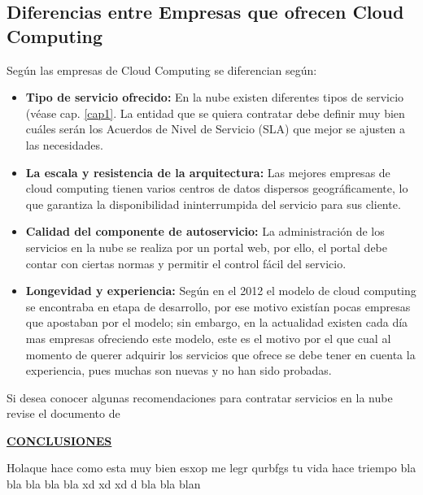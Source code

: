 \documentclass[a4paper, 12pt]{report}
\begin{document}
\begin{justify}
\section{Diferencias entre Empresas que ofrecen Cloud Computing}
 Seg\'un \cite{Akami} las empresas de Cloud Computing se diferencian seg\'un:
\begin{itemize}
	\item \textbf{Tipo de servicio ofrecido: } En la nube existen diferentes tipos de servicio (v\'ease cap. \ref{cap1}. La entidad que se quiera contratar debe definir muy bien cu\'ales ser\'an los Acuerdos de Nivel de Servicio (SLA) que mejor se ajusten a las necesidades.
	\item \textbf{La escala y resistencia de la arquitectura:} Las mejores empresas de cloud computing tienen varios centros de datos dispersos geográficamente, lo que garantiza la disponibilidad ininterrumpida del servicio para sus cliente.
	\item \textbf{Calidad del componente de autoservicio:} La administraci\'on  de los servicios en la nube se realiza por un portal web, por ello, el portal debe contar con ciertas normas y permitir el control f\'acil del servicio.
	\item \textbf{Longevidad y experiencia:} Seg\'un \cite{CristianCA} en el 2012  el modelo de cloud computing se encontraba en etapa de desarrollo, por ese motivo existían pocas empresas que apostaban por el modelo; sin embargo,  en la actualidad existen cada día mas empresas ofreciendo este modelo, este es el motivo por el que cual al momento de querer adquirir los servicios que ofrece se debe tener en cuenta la experiencia, pues muchas son nuevas y no han sido probadas.
\end{itemize}
\par Si desea conocer algunas recomendaciones para contratar servicios en la nube revise el documento de \cite{Beimar}



\end{justify}




\newpage
\vspace*{6em}
\begin{center}
{\bf{\large{\underline{CONCLUSIONES}}}}
\end{center}
\begin{justify}
Holaque hace como esta muy bien esxop me legr qurbfgs tu vida hace triempo bla bla bla bla bla xd xd xd d bla bla blan
\end{justify}



\vspace*{6em}
 
\end{document}
